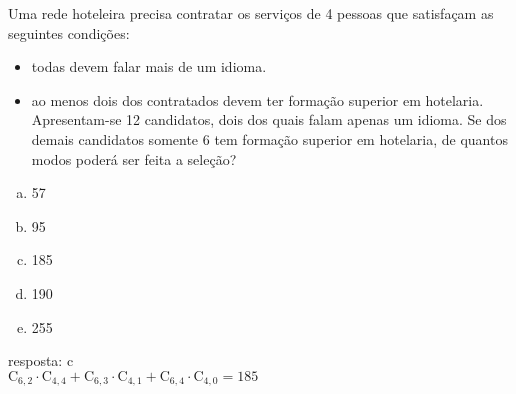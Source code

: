 \begin{ex}
Uma rede hoteleira precisa contratar os serviços de 4 pessoas que satisfaçam as seguintes condições: 
   \begin{itemize}
   \item todas devem falar mais de um idioma.
   \item ao menos dois dos contratados devem ter formação superior em hotelaria.
   Apresentam-se 12 candidatos, dois dos quais falam apenas um idioma. Se dos demais candidatos somente 6 tem formação superior em hotelaria, de quantos modos poderá ser feita a seleção?
   \end{itemize}
   \begin{enumerate}[(a)]
   \item 57
   \item 95
   \item 185
   \item 190
   \item 255
   \end{enumerate}
     \begin{sol}
       resposta: c \\
       $\mathrm{C}_{6,2}\cdot\mathrm{C}_{4,4}+\mathrm{C}_{6,3}\cdot\mathrm{C}_{4,1}+\mathrm{C}_{6,4}\cdot\mathrm{C}_{4,0}=185$
     \end{sol}
\end{ex}